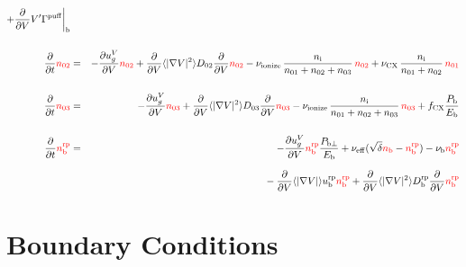 \documentclass[11pt]{article}
\def\r#1{{\rm#1}}
\def\aves#1{\langle#1\rangle}
\def\dd#1#2{\frac{\partial #1}{\partial #2}}
\def\ddV{\frac{\partial}{\partial V}}
\def\ni{n_\r{i}}
\def\nb{n_\r{b}}
\def\nna{n_{01}}
\def\nnb{n_{02}}
\def\nnc{n_{03}}
\def\Pb{P_\r{b}}
\def\Eb{E_\r{b}}
\def\ugV{u_{g}^V}
\def\ddt{\frac{\partial}{\partial t}}
\def\nbrp{n_\r{b}^\r{rp}}
\def\Pbperp{P_{\r{b}\perp}}
\def\nueff{\nu_\r{eff}}
\def\ubrp{u_\r{b}^\r{rp}}
\def\Dbrp{D_\r{b}^\r{rp}}
\def\fCX{f_\r{CX}}
\def\nuCX{\nu_\r{CX}}
\def\nuion{\nu_\r{ionize}}
\def\nub{\nu_\r{b}}
\def\red#1{\textcolor{red}{#1}}
\begin{document}
\begin{eqnarray}
%
  + \ddV V' \Gamma^\r{puff}\biggr|_\r{b}
\\[5mm]
  \ddt \red{\nnb} &=& 
%
  - \dd{\ugV}{V} \red{\nnb}
%
  + \ddV \aves{|\nabla V|^2} D_{02} \ddV \red{\nnb}
%
  - \nuion\, \frac{\ni}{\nna + \nnb + \nnc}\, \red{\nnb}
%
  + \nuCX\, \frac{\ni}{\nna + \nnb}\, \red{\nna}
%
\\[5mm]
  \ddt \red{\nnc} &=& 
%
  - \dd{\ugV}{V} \red{\nnc}
%
  + \ddV \aves{|\nabla V|^2} D_{03} \ddV \red{\nnc}
%
  - \nuion\, \frac{\ni}{\nna + \nnb + \nnc}\, \red{\nnc}
%
  + \fCX \frac{\Pb}{\Eb}
\\[5mm]
  \ddt \red{\nbrp} &=&
%
  - \dd{\ugV}{V} \red{\nbrp}
%
    \frac{\Pbperp}{\Eb}
%
  + \nueff (\sqrt{\delta} \red{\nb} - \red{\nbrp})
%
  - \nub \red{\nbrp}
%
\nonumber\\[2.5mm]&&{}
  - \ddV \aves{|\nabla V|} \ubrp \red{\nbrp} 
  + \ddV \aves{|\nabla V|^2} \Dbrp \ddV \red{\nbrp}
\end{eqnarray}

\bigskip

\section{Boundary Conditions}
\end{document}
